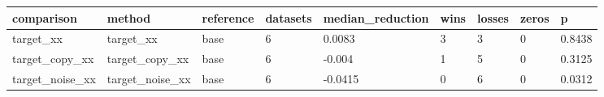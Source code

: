 \begin{tabular}{lllllllll}
\toprule
comparison & method & reference & datasets & median\_reduction & wins & losses & zeros & p \\
\midrule
target\_xx & target\_xx & base & 6 & 0.0083 & 3 & 3 & 0 & 0.8438 \\
target\_copy\_xx & target\_copy\_xx & base & 6 & -0.004 & 1 & 5 & 0 & 0.3125 \\
target\_noise\_xx & target\_noise\_xx & base & 6 & -0.0415 & 0 & 6 & 0 & 0.0312 \\
\bottomrule
\end{tabular}
